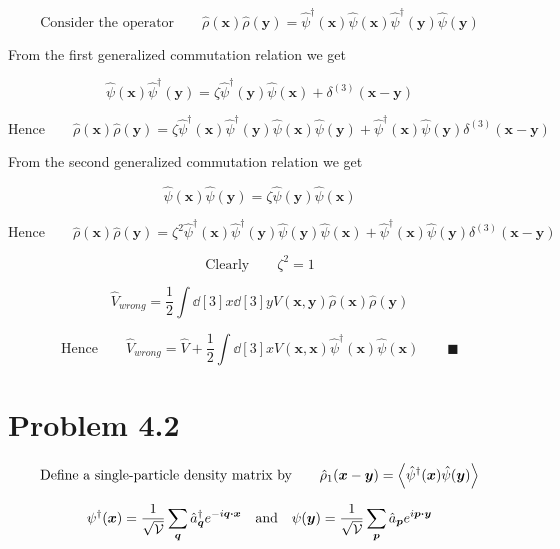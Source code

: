 \documentclass{amsart}
\begin{document}
\[ \text{Consider the operator}\qquad \hat{\rho}(\boldsymbol{x})\hat{\rho}(\boldsymbol{y})=
   \hat{\psi}^\dagger(\boldsymbol{x})\hat{\psi}(\boldsymbol{x})\hat{\psi}^\dagger(\boldsymbol{y})\hat{\psi}(\boldsymbol{y}) \]  

   From the first generalized commutation relation we get

\[  \hat{\psi}(\boldsymbol{x})\hat{\psi}^\dagger(\boldsymbol{y}) = \zeta \hat{\psi}^\dagger(\boldsymbol{y})\hat{\psi}(\boldsymbol{x})+\delta^{(3)}(\boldsymbol{x}-\boldsymbol{y})\]

\[ \text{Hence}\qquad \hat{\rho}(\boldsymbol{x})\hat{\rho}(\boldsymbol{y})=
    \zeta\hat{\psi}^\dagger(\boldsymbol{x})\hat{\psi}^\dagger(\boldsymbol{y})\hat{\psi}(\boldsymbol{x})\hat{\psi}(\boldsymbol{y})+
    \hat{\psi}^\dagger(\boldsymbol{x})\hat{\psi}(\boldsymbol{y})\delta^{(3)}(\boldsymbol{x}-\boldsymbol{y})\]  

From the second generalized commutation relation we get

\[  \hat{\psi}(\boldsymbol{x})\hat{\psi}(\boldsymbol{y}) = \zeta \hat{\psi}(\boldsymbol{y})\hat{\psi}(\boldsymbol{x})\]
 
\[ \text{Hence}\qquad \hat{\rho}(\boldsymbol{x})\hat{\rho}(\boldsymbol{y})=
   \zeta^2 \hat{\psi}^\dagger(\boldsymbol{x})
    \hat{\psi}^\dagger(\boldsymbol{y})\hat{\psi}(\boldsymbol{y})\hat{\psi}(\boldsymbol{x}) +\hat{\psi}^\dagger(\boldsymbol{x})\hat{\psi}(\boldsymbol{y})\delta^{(3)}(\boldsymbol{x}-\boldsymbol{y})\] 

\[\text{Clearly}\qquad \zeta^{2}=1 \]

\[ \hat{V}_{wrong} =\frac{1}{2 }\int \dd[3]{x}\dd[3]{y}V(\boldsymbol{x},\boldsymbol{y}) \hat{\rho}(\boldsymbol{x})\hat{\rho}(\boldsymbol{y}) \]

\[ \text{Hence}\qquad \hat{V}_{wrong} =\hat{V}+\frac{1}{2 }\int \dd[3]{x}V(\boldsymbol{x},\boldsymbol{x}) \hat{\psi}^\dagger(\boldsymbol{x})\hat{\psi}(\boldsymbol{x})\qquad\blacksquare
\]


\section*{Problem 4.2}

\[ \text{Define a single-particle density matrix by}\qquad  \hat{\rho}_{1}(\boldsymbol{x}-\boldsymbol{y})=\expval{\hat{\psi}^\dagger(\boldsymbol{x})\hat{\psi}(\boldsymbol{y})}\]

\[ {\psi}^\dagger(\boldsymbol{x})=\frac{1}{\sqrt{\mathcal{V}}} \sum_{\boldsymbol{q}} \hat{a}^{\dagger}_{\boldsymbol{q}}e^{-i\boldsymbol{q}\vdot\boldsymbol{x}} \qq{and}{\psi}(\boldsymbol{y})=\frac{1}{\sqrt{\mathcal{V}}} \sum_{\boldsymbol{p}} \hat{a}_{\boldsymbol{p}}e^{i\boldsymbol{p}\vdot\boldsymbol{y}} \]
\end{document}
